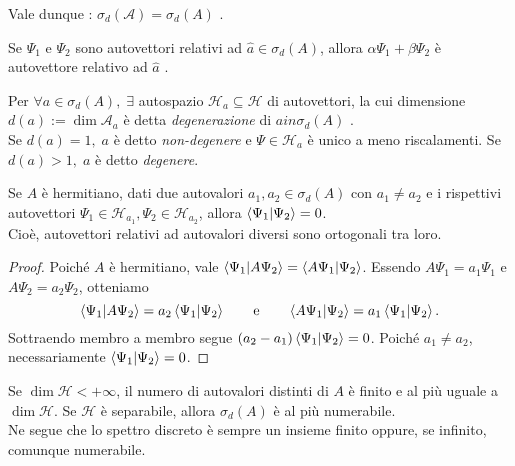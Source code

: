 \begin{remark}
    Vale dunque : \(\sigma_d(\mathcal{A})= \sigma_d(A)\) .
\end{remark}

\begin{remark}
    Se \(\Psi_1\) e \(\Psi_2\) sono autovettori relativi ad \(\hat{a} \in \sigma_d(A)\), allora \(\alpha\Psi_1+ \beta\Psi_2\) è autovettore relativo ad \(\hat{a}\) .
\end{remark}
\begin{definition}
    Per \(\forall a \in \sigma_d(A) , \; \exists\) autospazio \(\mathcal{H}_a\subseteq\mathcal{H}\) di autovettori, 
    la cui dimensione \(d(a):= \operatorname{dim}\mathcal{A}_a\) è detta \textit{degenerazione} di \(a in \sigma_d(A)\) .\\
    Se \(d(a)=1,\; a \) è detto \textit{non-degenere} e \(\Psi\in \mathcal{H}_a\) è unico a meno riscalamenti. Se \(d(a)>1, \; a\) è detto \textit{degenere}.
\end{definition}

\begin{theorem}
    Se \(A\) è hermitiano, dati due autovalori \(a_1, a_2 \in \sigma_d(A)\) con \(a_1\neq a_2\) e i rispettivi autovettori 
    \(\Psi_1 \in \mathcal{H}_{a_1}, \Psi_2 \in \mathcal{H}_{a_2}\), allora \(\braket{\Psi_1}{\Psi_2}=0\).\\
    Cioè, autovettori relativi ad autovalori diversi sono ortogonali tra loro.
\end{theorem}
\begin{proof}
    Poiché \(A\) è hermitiano, vale \(\braket{\Psi_1}{A\Psi_2}= \braket{A\Psi_1}{\Psi_2}\). Essendo 
    \(A\Psi_1=a_1\Psi_1\) e \(A\Psi_2=a_2\Psi_2\), otteniamo
    \[
        \braket{\Psi_1}{A\Psi_2}= a_2\braket{\Psi_1}{\Psi_2} \qquad \text{e} \qquad
        \braket{A\Psi_1}{\Psi_2}= a_1\braket{\Psi_1}{\Psi_2}.
    \]
    Sottraendo membro a membro segue \((a_2-a_1)\braket{\Psi_1}{\Psi_2}=0\). Poiché \(a_1\neq a_2\), 
    necessariamente \(\braket{\Psi_1}{\Psi_2}=0\).
\end{proof}

\begin{remark}
    Se \(\dim \mathcal{H} < +\infty\), il numero di autovalori distinti di \(A\) è finito e al più uguale a \(\dim \mathcal{H}\).
    Se \(\mathcal{H}\) è separabile, allora \(\sigma_d(A)\) è al più numerabile.\\
    Ne segue che lo spettro discreto è sempre un insieme finito oppure, se infinito, comunque numerabile.
\end{remark}

